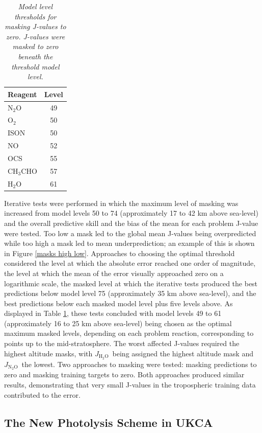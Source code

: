 \documentclass[journal abbreviation, manuscript]{copernicus}
\newcommand{\JNNO}{\ensuremath{J_{\mathrm{N_2O}}}}
\newcommand{\JHHO}{\ensuremath{J_{\mathrm{H_2O}}}}
\begin{document}
\begin{table}[htbp]
\centering
\caption{\textit{Model level thresholds for masking J-values to zero. J-values were masked to zero beneath the threshold model level.}}
\begin{tabular}{|lc|}
\hline
Reagent & Level \\
\hline
N$_2$O     & 49 \\
O$_2$      & 50 \\
ISON       & 50 \\
NO         & 52 \\
OCS        & 55 \\
CH$_3$CHO  & 57 \\
H$_2$O     & 61 \\
\hline
\end{tabular}
\label{mask lvls}
\end{table}

Iterative tests were performed in which the maximum level of masking was increased from model levels 50 to 74 (approximately 17 to 42 km above sea-level) and the overall predictive skill and the bias of the mean for each problem J-value were tested. Too low a mask led to the global mean J-values being overpredicted while too high a mask led to mean underprediction; an example of this is shown in Figure \ref{masks high low}. Approaches to choosing the optimal threshold considered the level at which the absolute error reached one order of magnitude, the level at which the mean of the error visually approached zero on a logarithmic scale, the masked level at which the iterative tests produced the best predictions below model level 75 (approximately 35 km above sea-level), and the best predictions below each masked model level plus five levels above. As displayed in Table \ref{mask lvls}, these tests concluded with model levels 49 to 61 (approximately 16 to 25 km above sea-level) being chosen as the optimal maximum masked levels, depending on each problem reaction, corresponding to points up to the mid-stratosphere. The worst affected J-values required the highest altitude masks, with \JHHO\ being assigned the highest altitude mask and \JNNO\ the lowest. Two approaches to masking were tested: masking predictions to zero and masking training targets to zero. Both approaches produced similar results, demonstrating that very small J-values in the tropospheric training data contributed to the error.

\subsection{The New Photolysis Scheme in UKCA}
\end{document}
